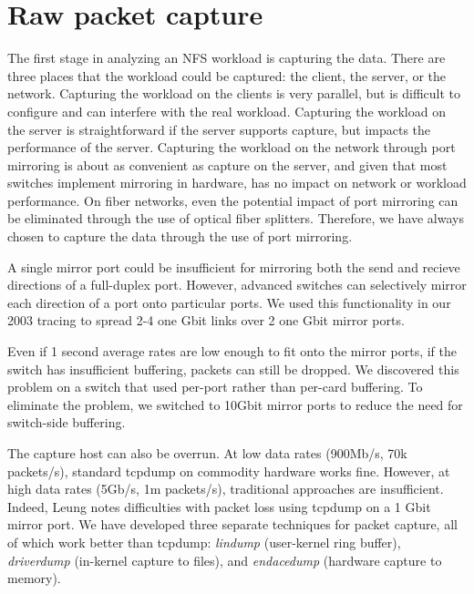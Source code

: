 \section{Raw packet capture}
\label{sec:capture}

The first stage in analyzing an NFS workload is capturing the data.
There are three places that the workload could be captured: the
client, the server, or the network.  Capturing the workload on the
clients is very parallel, but is difficult to configure and can
interfere with the real workload.  Capturing the workload on the
server is straightforward if the server supports capture, 
but impacts the performance of the
server.  Capturing the workload on the network through port mirroring
is about as convenient as capture on the server, and given that most
switches implement mirroring in hardware, has no impact on network or
workload performance.  On fiber networks, even the potential impact of
port mirroring can be eliminated through the use of optical fiber
splitters. Therefore, we have always chosen to capture the
data through the use of port mirroring.

A single mirror port could be insufficient for mirroring both the send
and recieve directions of a full-duplex port.  However, advanced
switches can selectively mirror each direction of a port onto
particular ports.  We used this functionality in our 2003 tracing to
spread 2-4 one Gbit links over 2 one Gbit mirror ports.

Even if 1 second average rates are low enough to fit onto the mirror
ports, if the switch has insufficient buffering, packets can still be
dropped. We discovered this problem on a switch that used per-port
rather than per-card buffering.  To eliminate the problem, we switched
to 10Gbit mirror ports to reduce the need for switch-side buffering.

The capture host can also be overrun. At low data rates (900Mb/s,
70k packets/s), standard tcpdump on commodity hardware works fine.
However, at high data rates (5Gb/s, 1m packets/s),
traditional approaches are insufficient. Indeed,
Leung\cite{LeungUsenix08} notes
difficulties with packet loss using tcpdump on a 1 Gbit mirror port.
We have developed three separate techniques for packet capture, all of
which work better than tcpdump: {\it lindump} (user-kernel ring
buffer), {\it driverdump} (in-kernel capture to files), and {\it
endacedump} (hardware capture to memory).  

